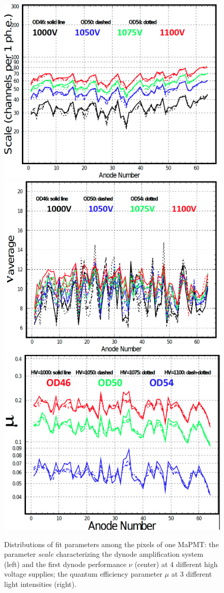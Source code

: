 \documentclass[5p,times,twocolumn]{elsarticle}
\begin{document}
\begin{figure}[h]
\begin{center}
	\includegraphics[width=0.85\linewidth]{Pavel_pass1.png}
	\includegraphics[width=0.85\linewidth]{Pavel_pass2.png}
	\includegraphics[width=0.85\linewidth]{Pavel_pass3.png}
	\caption{Distributions of fit parameters among the pixels of one MaPMT: the parameter $scale$ characterizing
          the dynode amplification system (left) and the first dynode performance $\nu$ (center) at 4 different high
          voltage supplies; the quantum efficiency parameter $\mu$ at 3 different light intensities (right).}
	\label{fig:PavelPassport}
\end{center}
\end{figure}
\end{document}

